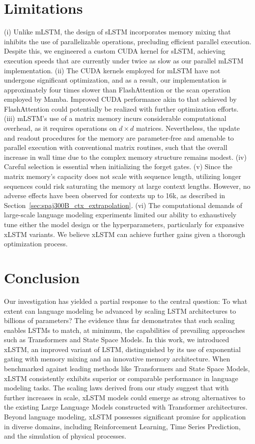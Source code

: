 \section{Limitations}

(i) Unlike mLSTM, the design of sLSTM incorporates memory mixing that inhibits the use of parallelizable operations, precluding efficient parallel execution. Despite this, we engineered a custom CUDA kernel for sLSTM, achieving execution speeds that are currently under twice as slow as our parallel mLSTM implementation. (ii) The CUDA kernels employed for mLSTM have not undergone significant optimization, and as a result, our implementation is approximately four times slower than FlashAttention or the scan operation employed by Mamba. Improved CUDA performance akin to that achieved by FlashAttention could potentially be realized with further optimization efforts. (iii) mLSTM’s use of a matrix memory incurs considerable computational overhead, as it requires operations on $d \times d$ matrices. Nevertheless, the update and readout procedures for the memory are parameter-free and amenable to parallel execution with conventional matrix routines, such that the overall increase in wall time due to the complex memory structure remains modest. (iv) Careful selection is essential when initializing the forget gates. (v) Since the matrix memory’s capacity does not scale with sequence length, utilizing longer sequences could risk saturating the memory at large context lengths. However, no adverse effects have been observed for contexts up to 16k, as described in Section~\ref{sec:spaj300B_ctx_extrapolation}. (vi) The computational demands of large-scale language modeling experiments limited our ability to exhaustively tune either the model design or the hyperparameters, particularly for expansive xLSTM variants. We believe xLSTM can achieve further gains given a thorough optimization process.

\section{Conclusion}
Our investigation has yielded a partial response to the central question: To what extent can language modeling be advanced by scaling LSTM architectures to billions of parameters? The evidence thus far demonstrates that such scaling enables LSTMs to match, at minimum, the capabilities of prevailing approaches such as Transformers and State Space Models. In this work, we introduced xLSTM, an improved variant of LSTM, distinguished by its use of exponential gating with memory mixing and an innovative memory architecture. When benchmarked against leading methods like Transformers and State Space Models, xLSTM consistently exhibits superior or comparable performance in language modeling tasks. The scaling laws derived from our study suggest that with further increases in scale, xLSTM models could emerge as strong alternatives to the existing Large Language Models constructed with Transformer architectures. Beyond language modeling, xLSTM possesses significant promise for application in diverse domains, including Reinforcement Learning, Time Series Prediction, and the simulation of physical processes.

